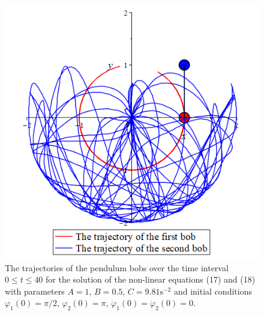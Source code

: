 \documentclass[11pt]{article}
\begin{document}
\begin{figure}[H]
    \centering
    \includegraphics[scale=0.45]{Figure5.PNG}
    \caption{The trajectories of the pendulum bobs over the time interval \(0\le t\le 40\) for the solution of the non-linear equations (17) and (18) with parameters \(A = 1\), \(B= 0.5\), \(C = 9.81 \mathrm{s}^{-2}\) and initial conditions \(\varphi_1(0)=\pi/2\), \(\varphi_2(0) = \pi\), \(\dot{\varphi}_1(0) = \dot{\varphi}_2(0) = 0\).}
    \label{Figure 5}
\end{figure}
\end{document}
